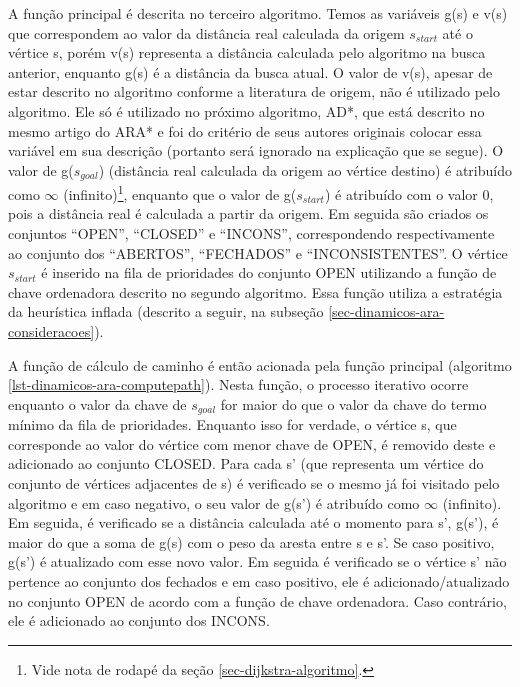 
A função principal é descrita no terceiro algoritmo. Temos as variáveis g(s) e v(s) que correspondem ao valor da distância real calculada da origem $s_{start}$ até o vértice s, porém v(s) representa a distância calculada pelo algoritmo na busca anterior, enquanto g(s) é a distância da busca atual. O valor de v(s), apesar de estar descrito no algoritmo conforme a literatura de origem, não é utilizado pelo algoritmo. Ele só é utilizado no próximo algoritmo, AD*, que está descrito no mesmo artigo do ARA* e foi do critério de seus autores originais colocar essa variável em sua descrição (portanto será ignorado na explicação que se segue). O valor de g($s_{goal}$) (distância real calculada da origem ao vértice destino) é atribuído como $\infty$ (infinito)\footnote{Vide nota de rodapé da seção \ref{sec-dijkstra-algoritmo}.}, enquanto que o valor de g($s_{start}$) é atribuído com o valor 0, pois a distância real é calculada a partir da origem. Em seguida são criados os conjuntos ``OPEN'', ``CLOSED'' e ``INCONS'', correspondendo respectivamente ao conjunto dos ``ABERTOS'', ``FECHADOS'' e ``INCONSISTENTES''. O vértice $s_{start}$ é inserido na fila de prioridades do conjunto OPEN utilizando a função de chave ordenadora descrito no segundo algoritmo. Essa função utiliza a estratégia da heurística inflada (descrito a seguir, na subseção \ref{sec-dinamicos-ara-consideracoes}).

A função de cálculo de caminho é então acionada pela função principal (algoritmo \ref{lst-dinamicos-ara-computepath}). Nesta função, o processo iterativo ocorre enquanto o valor da chave de $s_{goal}$ for maior do que o valor da chave do termo mínimo da fila de prioridades. Enquanto isso for verdade, o vértice s, que corresponde ao valor do vértice com menor chave de OPEN, é removido deste e adicionado ao conjunto CLOSED. Para cada s' (que representa um vértice do conjunto de vértices adjacentes de s) é verificado se o mesmo já foi visitado pelo algoritmo e em caso negativo, o seu valor de g(s') é atribuído como $\infty$ (infinito). Em seguida, é verificado se a distância calculada até o momento para s', g(s'), é maior do que a soma de g(s) com o peso da aresta entre s e s'. Se caso positivo, g(s') é atualizado com esse novo valor. Em seguida é verificado se o vértice s' não pertence ao conjunto dos fechados e em caso positivo, ele é adicionado/atualizado no conjunto OPEN de acordo com a função de chave ordenadora. Caso contrário, ele é adicionado ao conjunto dos INCONS.

